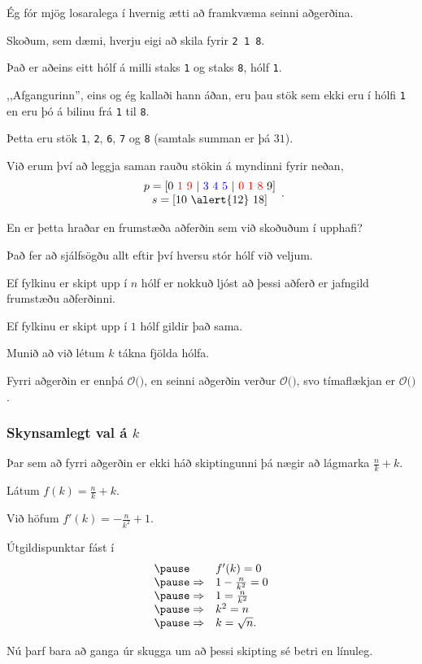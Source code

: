 {
	{
		\item<1-> Ég fór mjög losaralega í hvernig ætti að framkvæma seinni aðgerðina.
		\item<2-> Skoðum, sem dæmi, hverju eigi að skila fyrir \texttt{2 1 8}.
		\item<3-> Það er aðeins eitt hólf á milli staks \texttt{1} og staks \texttt{8}, hólf \texttt{1}.
		\item<4-> ,,Afgangurinn'', eins og ég kallaði hann áðan, eru þau stök sem ekki eru í hólfi \texttt{1}
			en eru þó á bilinu frá \texttt{1} til \texttt{8}.
		\item<5-> Þetta eru stök \texttt{1}, \texttt{2}, \texttt{6}, \texttt{7} og \texttt{8} (samtals summan er þá $31$).
		\item<6-> Við erum því að leggja saman rauðu stökin á myndinni fyrir neðan,
			\[
			\begin {array}{c}
				p = [0\ {\color{red} 1 \ 9\ }|\ {\color{blue}3\ 4\ 5\ } |\ {\color{red} 0\ 1\ 8\ } 9]\\ 
				s = [10\ \alert{12}\ 18]
		\end {array}.
			\]
	}
}

{
	{
		\item<1-> En er þetta hraðar en frumstæða aðferðin sem við skoðuðum í upphafi?
		\item<2-> Það fer að sjálfsögðu allt eftir því hversu stór hólf við veljum.
		\item<3-> Ef fylkinu er skipt upp í $n$ hólf er nokkuð ljóst að þessi aðferð er jafngild frumstæðu aðferðinni.
		\item<4-> Ef fylkinu er skipt upp í $1$ hólf gildir það sama.
		\item<5-> Munið að við létum $k$ tákna fjölda hólfa.
		\item<6-> Fyrri aðgerðin er ennþá $\mathcal{O}($\onslide<7->{$\,1\,$}$)$,
			en seinni aðgerðin verður $\mathcal{O}($\onslide<8->{$n/k + k$}$)$,
			svo tímaflækjan er $\mathcal{O}($\onslide<9->{$qn/k + qk$}$)$.
	}
}

{
	\frametitle{Skynsamlegt val á $k$}
	{
		\item Þar sem að fyrri aðgerðin er ekki háð skiptingunni þá nægir að lágmarka $\frac{n}{k} + k$.
		\pause\item Látum $f(k) = \frac{n}{k} + k$.
		\pause\item Við höfum $f'(k) = -\frac{n}{k^2} + 1$.
		\pause\item Útgildispunktar fást í
			\[
				\begin{array}{l l}
				\pause& f'(k) = 0\\
				\pause\Rightarrow & 1 - \frac{n}{k^2} = 0\\
				\pause\Rightarrow & 1 = \frac{n}{k^2}\\
				\pause\Rightarrow & k^2 = n\\
				\pause\Rightarrow & k = \sqrt{n}.
			\end{array}
			\]
		\pause\item Nú þarf bara að ganga úr skugga um að þessi skipting sé betri en línuleg.
}
}

